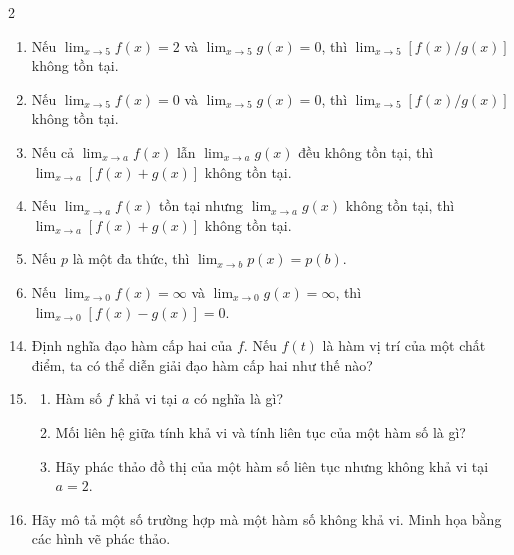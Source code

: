 \begin{multicols}{2}
\begin{enumerate}[label=\textbf{\arabic*.}, leftmargin=1.8em, itemsep=1.1ex, topsep=0pt]
  \item Nếu $\lim_{x\to 5} f(x) = 2$ và $\lim_{x\to 5} g(x) = 0$, thì $\lim_{x\to 5} [f(x)/g(x)]$ không tồn tại.

  \item Nếu $\lim_{x\to 5} f(x) = 0$ và $\lim_{x\to 5} g(x) = 0$, thì $\lim_{x\to 5} [f(x)/g(x)]$ không tồn tại.

  \item Nếu cả $\lim_{x\to a} f(x)$ lẫn $\lim_{x\to a} g(x)$ đều không tồn tại, thì $\lim_{x\to a} [f(x)+g(x)]$ không tồn tại.

  \item Nếu $\lim_{x\to a} f(x)$ tồn tại nhưng $\lim_{x\to a} g(x)$ không tồn tại, thì $\lim_{x\to a} [f(x)+g(x)]$ không tồn tại.

  \item Nếu $p$ là một đa thức, thì $\lim_{x\to b} p(x) = p(b)$.

  \item Nếu $\lim_{x\to 0} f(x) = \infty$ và $\lim_{x\to 0} g(x) = \infty$, thì $\lim_{x\to 0} [f(x)-g(x)] = 0$.
\end{enumerate}

\vfill\null
\columnbreak

\begin{enumerate}[label=\textbf{\arabic*.}, leftmargin=1.8em, itemsep=0.8ex, topsep=0pt]
\setcounter{enumi}{13}
  \item Định nghĩa đạo hàm cấp hai của $f$. Nếu $f(t)$ là hàm vị trí của một chất điểm, ta có thể diễn giải đạo hàm cấp hai như thế nào?

  \item 
  \begin{enumerate}[label=\textbf{(\alph*)}, leftmargin=1.8em, itemsep=0.3ex, topsep=0pt]
    \item Hàm số $f$ khả vi tại $a$ có nghĩa là gì?
    \item Mối liên hệ giữa tính khả vi và tính liên tục của một hàm số là gì?
    \item Hãy phác thảo đồ thị của một hàm số liên tục nhưng không khả vi tại $a = 2$.
  \end{enumerate}

  \item Hãy mô tả một số trường hợp mà một hàm số không khả vi. Minh họa bằng các hình vẽ phác thảo.
\end{enumerate}

\vspace{1.5em}

\noindent{\color{stewartcyan}\rule{\linewidth}{1.2pt}}


\end{multicols}
